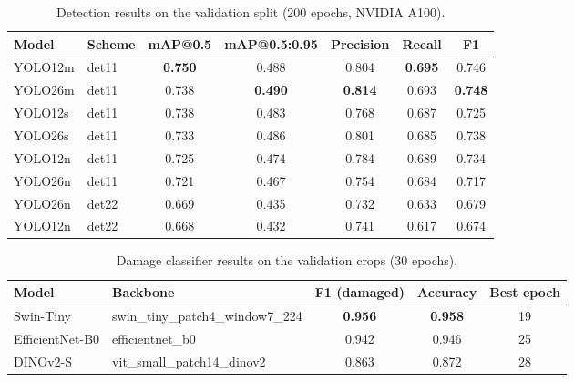 
\begin{table}[htbp]
\centering
\caption{Detection results on the validation split (200 epochs, NVIDIA A100).}
\label{tab:det-val}
\begin{tabular}{llccccc}
\hline
Model & Scheme & mAP@0.5 & mAP@0.5:0.95 & Precision & Recall & F1 \\
\hline
YOLO12m & det11 & \textbf{0.750} & 0.488 & 0.804 & \textbf{0.695} & 0.746 \\
YOLO26m & det11 & 0.738 & \textbf{0.490} & \textbf{0.814} & 0.693 & \textbf{0.748} \\
YOLO12s & det11 & 0.738 & 0.483 & 0.768 & 0.687 & 0.725 \\
YOLO26s & det11 & 0.733 & 0.486 & 0.801 & 0.685 & 0.738 \\
YOLO12n & det11 & 0.725 & 0.474 & 0.784 & 0.689 & 0.734 \\
YOLO26n & det11 & 0.721 & 0.467 & 0.754 & 0.684 & 0.717 \\
YOLO26n & det22 & 0.669 & 0.435 & 0.732 & 0.633 & 0.679 \\
YOLO12n & det22 & 0.668 & 0.432 & 0.741 & 0.617 & 0.674 \\
\hline
\end{tabular}
\end{table}

\begin{table}[htbp]
\centering
\caption{Damage classifier results on the validation crops (30 epochs).}
\label{tab:cls-val}
\begin{tabular}{llccc}
\hline
Model & Backbone & F1 (damaged) & Accuracy & Best epoch \\
\hline
Swin-Tiny & swin\_tiny\_patch4\_window7\_224 & \textbf{0.956} & \textbf{0.958} & 19 \\
EfficientNet-B0 & efficientnet\_b0 & 0.942 & 0.946 & 25 \\
DINOv2-S & vit\_small\_patch14\_dinov2 & 0.863 & 0.872 & 28 \\
\hline
\end{tabular}
\end{table}

